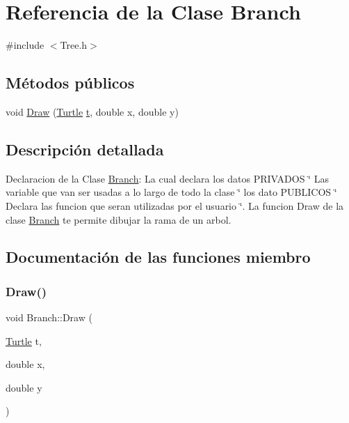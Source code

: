 \hypertarget{class_branch}{}\section{Referencia de la Clase Branch}
\label{class_branch}


{\ttfamily \#include $<$Tree.\+h$>$}

\subsection*{Métodos públicos}
\begin{DoxyCompactItemize}
\item 
void \mbox{\hyperlink{class_branch_aaeef8995ecc6b206f676f00b6f3549cd}{Draw}} (\mbox{\hyperlink{class_turtle}{Turtle}} \mbox{\hyperlink{_abstract_8cpp_a87833ae07d42f160626b6355cd9f8cf0}{t}}, double x, double y)
\end{DoxyCompactItemize}


\subsection{Descripción detallada}
Declaracion de la Clase \mbox{\hyperlink{class_branch}{Branch}}\+: La cual declara los datos P\+R\+I\+V\+A\+D\+OS \char`\"{} Las variable que van ser usadas a lo largo de todo la clase \char`\"{} los dato P\+U\+B\+L\+I\+C\+OS \char`\"{} Declara las funcion que seran utilizadas por el usuario \char`\"{}. La funcion Draw de la clase \mbox{\hyperlink{class_branch}{Branch}} te permite dibujar la rama de un arbol. 

\subsection{Documentación de las funciones miembro}
\mbox{\label{class_branch_aaeef8995ecc6b206f676f00b6f3549cd}} 
\subsubsection{\texorpdfstring{Draw()}{Draw()}}
{\footnotesize\ttfamily void Branch\+::\+Draw (\begin{DoxyParamCaption}\item[{\mbox{\hyperlink{class_turtle}{Turtle}}}]{t,  }\item[{double}]{x,  }\item[{double}]{y }\end{DoxyParamCaption})\hspace{0.3cm}{\ttfamily [inline]}}

